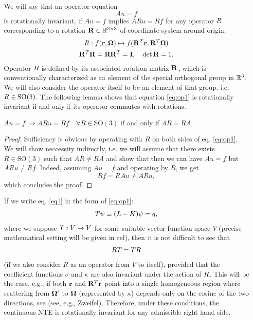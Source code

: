 We will say that an operator equation
\begin{equation}\label{eq:op1} 
Au = f
\end{equation}
is rotationally invariant, if $Au = f$ implies $ARu = Rf$ for any operator
$\op{R}$ corresponding to a rotation $\mat{R}\in\R[3\times3]$ of coordinate system around origin:
\begin{equation}\label{eq:def_rot}
\begin{gathered}
\op{R}: f(\br,\bomega) \mapsto f(\mat{R}^T\br,\mat{R}^T\bomega)\\
\mat{R}^T\mat{R} = \mat{R}\mat{R}^T = \mat{I},\quad \det \mat{R} = 1.
\end{gathered}
\end{equation}
Operator $\op{R}$ is defined by its associated rotation matrix $\mat{R}$, which is conventionally characterized as an
element of the special orthogonal group in $\R[3]$. We will also
consider the operator itself to be an element of that group, i.e.
$\op{R} \in \mathrm{SO}(3)$. The following lemma shows that equation \eqref{eq:op1} is rotationally invariant if and
only if its operator commutes with rotations.
\begin{lemma}\label{lemma1}
	$Au = f \ \Rightarrow ARu = Rf\quad \forall R\in \mathrm{SO}(3)$ if and only if $AR = RA$.
\end{lemma}
\begin{proof}
	Sufficiency is obvious by operating with $R$ on both sides of eq. \eqref{eq:op1}.
	We will show neccessity indirectly, i.e. we will assume that there exists $R\in\mathrm{SO}(3)$ such that $AR \neq RA$
	and show that then we can have $Au = f$ but $ARu \neq Rf$. Indeed, assuming $Au = f$ and operating by $R$, we get  
	$$
		Rf = RAu \neq ARu,
	$$
	which concludes the proof.
\end{proof}

If we write eq. \eqref{eq1} in the form of \eqref{eq:op1}:
\begin{equation}\label{eq1op}
	T\psi \equiv (\op{L} - \op{K})\psi = \op{q},
\end{equation} 
where we suppose $\op{T}:V\to V$ for some suitable vector function space $V$ (precise mathematical setting
will be given in \alert{ref}), then it is not difficult to see that 
\begin{equation}\label{eq:commut_NTE}
	\op{R}T = T\op{R}
\end{equation}
(if we also consider $R$ as an operator from $V$ to itself),
provided that the coefficient functions $\sigma$ and $\kappa$ are also invariant under the action of $\op{R}$. This
will be the case, e.g., if both $\br$ and $\mat{R}^T\br$ point into a single homogeneous region where scattering from
$\bomega'$ to $\bomega$ (represented by $\kappa$) depends only on the cosine of the two directions, see (see, e.g.,
\alert{Zweifel}). Therefore, under these conditions, the continuous NTE is rotationally invariant for any admissible
right hand side.

